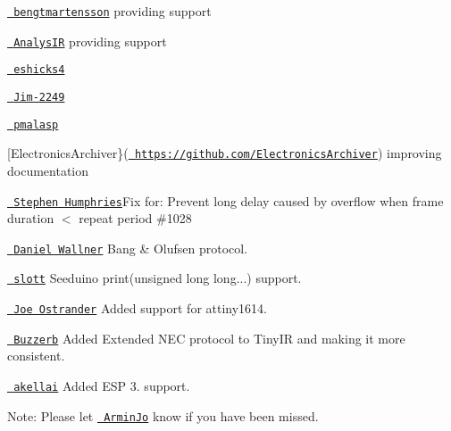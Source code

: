 \begin{DoxyItemize}
\item \href{https://github.com/bengtmartensson}{\texttt{ bengtmartensson}} providing support
\item \href{https:/github.com/AnalysIR}{\texttt{ Analys\+IR}} providing support
\item \href{https://github.com/eshicks4}{\texttt{ eshicks4}}
\item \href{https://github.com/Jim-2249}{\texttt{ Jim-\/2249}}
\item \href{https://github.com/pmalasp}{\texttt{ pmalasp}}
\item \mbox{[}Electronics\+Archiver\}(\href{https://github.com/ElectronicsArchiver}{\texttt{ https\+://github.\+com/\+Electronics\+Archiver}}) improving documentation
\item \href{https://github.com/sjahu}{\texttt{ Stephen Humphries}}Fix for\+: Prevent long delay caused by overflow when frame duration $<$ repeat period \#1028
\item \href{https://github.com/danielwallner}{\texttt{ Daniel Wallner}} Bang \& Olufsen protocol.
\item \href{https://stackoverflow.com/users/11680056/sklott}{\texttt{ slott}} Seeduino print(unsigned long long...) support.
\item \href{https://github.com/joeostrander}{\texttt{ Joe Ostrander}} Added support for attiny1614.
\item \href{https://github.com/Buzzerb}{\texttt{ Buzzerb}} Added Extended NEC protocol to Tiny\+IR and making it more consistent.
\item \href{https://github.com/akellai}{\texttt{ akellai}} Added ESP 3. support.
\end{DoxyItemize}

Note\+: Please let \href{https://github.com/ArminJo}{\texttt{ Armin\+Jo}} know if you have been missed. 